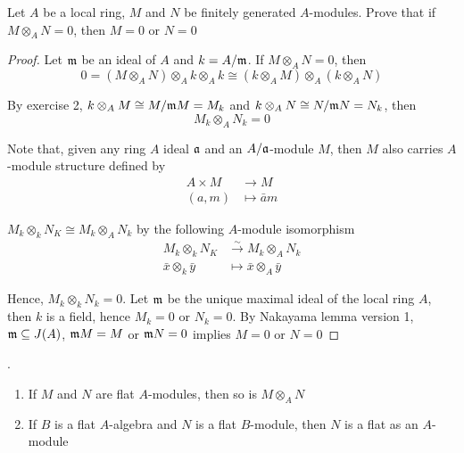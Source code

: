 \begin{problem}
	Let $A$ be a local ring, $M$ and $N$ be finitely generated $A$-modules. Prove that if $M \otimes_A N = 0$, then $M = 0$ or $N = 0$
\end{problem}

\begin{proof}
	Let $\mathfrak{m}$ be an ideal of $A$ and $k = A / \mathfrak{m}$. If $M \otimes_A N = 0$, then
	$$
		0 = (M \otimes_A N) \otimes_A k \otimes_A k \cong (k \otimes_A M) \otimes_A (k \otimes_A N)
	$$
	
	By exercise 2, $k \otimes_A M \cong M / \mathfrak{m} M = M_k$ and $k \otimes_A N \cong N / \mathfrak{m} N = N_k$, then 
	$$
		M_k \otimes_A N_k  = 0
	$$
	
	Note that, given any ring $A$ ideal $\mathfrak{a}$ and an $A/\mathfrak{a}$-module $M$, then $M$ also carries $A$-module structure defined by
	\begin{align*}
		A \times M &\to M \\
		(a, m) &\mapsto \bar{a} m
	\end{align*}
	
	$M_k \otimes_k N_K \cong M_k \otimes_A N_k$ by the following $A$-module isomorphism
	\begin{align*}
		M_k \otimes_k N_K &\xrightarrow{\sim} M_k \otimes_A N_k \\
			\bar{x} \otimes_k \bar{y} &\mapsto \bar{x} \otimes_A \bar{y}
	\end{align*}
	
	Hence, $M_k \otimes_k N_k  = 0$. Let $\mathfrak{m}$ be the unique maximal ideal of the local ring $A$, then $k$ is a field, hence $M_k = 0$ or $N_k = 0$. By Nakayama lemma version 1, $\mathfrak{m} \subseteq J(A)$, $\mathfrak{m} M = M$ or $\mathfrak{m} N = 0$ implies $M = 0$ or $N = 0$
\end{proof}

\begin{problem}.
	\begin{enumerate}
		\item If $M$ and $N$ are flat $A$-modules, then so is $M \otimes_A N$
		
		\item If $B$ is a flat $A$-algebra and $N$ is a flat $B$-module, then $N$ is a flat as an $A$-module
	\end{enumerate}
\end{problem}

